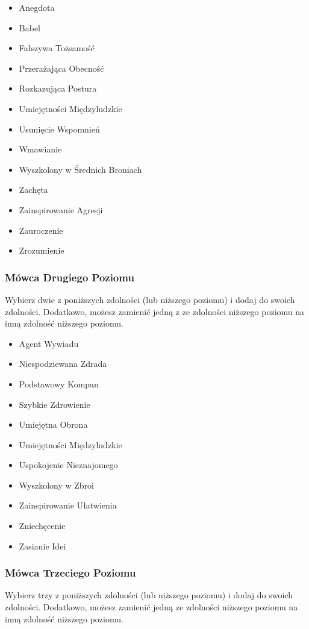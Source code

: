 \begin{itemize}
\item Anegdota
\item Babel
\item Fałszywa Tożsamość 
\item Przerażająca Obecność
\item Rozkazująca Postura
\item Umiejętności Międzyludzkie
\item Usunięcie Wspomnień
\item Wmawianie
\item Wyszkolony w Średnich Broniach
\item Zachęta
\item Zainspirowanie Agresji
\item Zauroczenie
\item Zrozumienie 
\end{itemize}

\subsubsection{Mówca Drugiego Poziomu}

Wybierz dwie z poniższych zdolności (lub niższego poziomu) i dodaj do swoich zdolności. Dodatkowo, możesz zamienić jedną z ze zdolności niższego poziomu na inną zdolność niższego poziomu.

\begin{itemize}
\item Agent Wywiadu
\item Niespodziewana Zdrada
\item Podstawowy Kompan
\item Szybkie Zdrowienie
\item Umiejętna Obrona
\item Umiejętności Międzyludzkie
\item Uspokojenie Nieznajomego
\item Wyszkolony w Zbroi
\item Zainspirowanie Ułatwienia
\item Zniechęcenie
\item Zasianie Idei
\end{itemize}

\subsubsection{Mówca Trzeciego Poziomu}

Wybierz trzy z poniższych zdolności (lub niższego poziomu) i dodaj do swoich zdolności. Dodatkowo, możesz zamienić jedną ze zdolności niższego poziomu na inną zdolność niższego poziomu.

